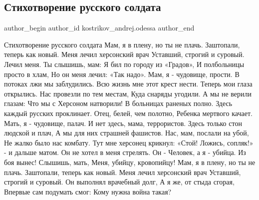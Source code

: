  
 
 
 
 
 
\subsection{Стихотворение русского солдата}
\label{sec:03_03_2022.fb.kostrikov_andrej.odessa.1.stih_russkogo_soldata}
 
\ifcmt
 author_begin
   author_id kostrikov_andrej.odessa
 author_end
\fi



\raggedcolumns
\begin{multicols}{2} %
\setlength{\parindent}{0pt}

\obeycr
Стихотворение русского солдата
Мам, я в плену, но ты не плачь.
Заштопали, теперь как новый.
Меня лечил херсонский врач
Уставший, строгий и суровый.
\smallskip
Лечил меня. Ты слышишь, мам:
Я бил по городу из «Градов»,
И полбольницы просто в хлам,
Но он меня лечил: «Так надо».
\smallskip
Мам, я - чудовище, прости.
В потоках лжи мы заблудились.
Всю жизнь мне этот крест нести.
Теперь мои глаза открылись.
\smallskip
Нас провезли по тем местам,
Куда снаряды угодили.
А мы не верили глазам:
Что мы с Херсоном натворили!
\smallskip
В больницах раненых полно.
Здесь каждый русских проклинает.
Отец, белей, чем полотно,
Ребенка мертвого качает.
\smallskip
Мать, я - чудовище, палач.
И нет здесь, мама, террористов.
Здесь только стон людской и плач,
А мы для них страшней фашистов.
\smallskip
Нас, мам, послали на убой,
Не жалко было нас комбату.
Тут мне херсонец крикнул: «Стой!
Ложись, сопляк!» - и дальше матом.
\smallskip
Он не хотел в меня стрелять.
Он - Человек, а я - убийца.
Из боя вынес! Слышишь, мать,
Меня, убийцу, кровопийцу!
Мам, я в плену, но ты не плачь.
\smallskip
Заштопали, теперь как новый.
Меня лечил херсонский врач
Уставший, строгий и суровый.
\smallskip
Он выполнял врачебный долг,
А я же, от стыда сгорая,
Впервые сам подумать смог:
Кому нужна война такая?
\restorecr
\end{multicols} %
